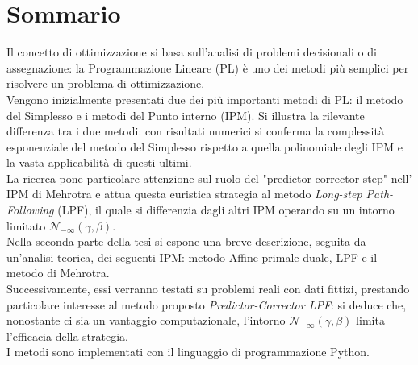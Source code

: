 \documentclass[a4paper,10 pt,titlepage,twoside]{report}
\theoremstyle{plain}
\theoremstyle{definition}
\theoremstyle{remark}
\begin{document}
\chapter*{Sommario}
Il concetto di ottimizzazione si basa sull'analisi di problemi decisionali o di assegnazione: la Programmazione Lineare (PL) è uno dei metodi più semplici per risolvere un problema di ottimizzazione.\\ 
Vengono inizialmente presentati due dei più importanti metodi di PL: il metodo del Simplesso e i metodi del Punto interno (IPM). Si illustra la rilevante differenza tra i due metodi: con risultati numerici si conferma la complessità esponenziale del metodo del Simplesso rispetto a quella polinomiale degli IPM e la vasta applicabilità di questi ultimi.\\
La ricerca pone particolare attenzione sul ruolo del "predictor-corrector step" nell' IPM di Mehrotra e attua questa euristica strategia al metodo \textit{Long-step Path-Following} (LPF), il quale si differenzia dagli altri  IPM operando su un intorno limitato $\mathcal{N}_{-\infty}(\gamma,\beta)$.\\
Nella seconda parte della tesi si espone una breve descrizione, seguita da un'analisi teorica, dei seguenti IPM: metodo Affine primale-duale, LPF e il metodo di Mehrotra.\\
Successivamente, essi verranno testati su problemi reali con dati fittizi, prestando particolare interesse al metodo proposto \textit{Predictor-Corrector LPF}: si deduce che, nonostante ci sia un vantaggio computazionale, l'intorno $\mathcal{N}_{-\infty}(\gamma,\beta)$ limita l'efficacia della strategia.\\   
I metodi sono implementati con il linguaggio di programmazione Python. 
\end{document}
